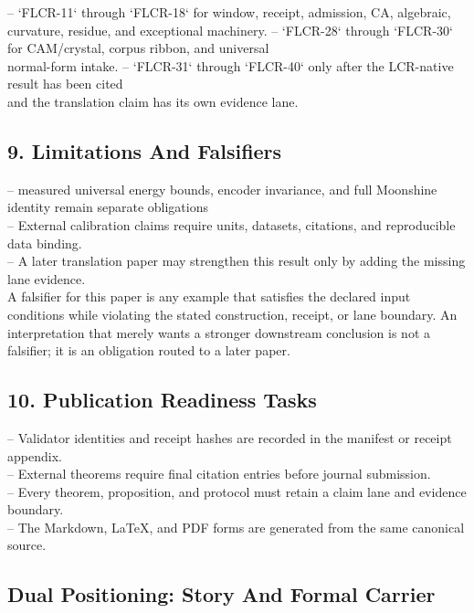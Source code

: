 \documentclass[11pt]{article}
\begin{document}
\noindent{}-- `FLCR-11` through `FLCR-18` for window, receipt, admission, CA, algebraic,\\
  curvature, residue, and exceptional machinery.
\noindent{}-- `FLCR-28` through `FLCR-30` for CAM/crystal, corpus ribbon, and universal\\
  normal-form intake.
\noindent{}-- `FLCR-31` through `FLCR-40` only after the LCR-native result has been cited\\
  and the translation claim has its own evidence lane.

\subsection*{9. Limitations And Falsifiers}

\noindent{}-- measured universal energy bounds, encoder invariance, and full Moonshine identity remain separate obligations\\
\noindent{}-- External calibration claims require units, datasets, citations, and reproducible data binding.\\
\noindent{}-- A later translation paper may strengthen this result only by adding the missing lane evidence.\\

A falsifier for this paper is any example that satisfies the declared input
conditions while violating the stated construction, receipt, or lane boundary.
An interpretation that merely wants a stronger downstream conclusion is not a
falsifier; it is an obligation routed to a later paper.

\subsection*{10. Publication Readiness Tasks}

\noindent{}-- Validator identities and receipt hashes are recorded in the manifest or receipt appendix.\\
\noindent{}-- External theorems require final citation entries before journal submission.\\
\noindent{}-- Every theorem, proposition, and protocol must retain a claim lane and evidence boundary.\\
\noindent{}-- The Markdown, LaTeX, and PDF forms are generated from the same canonical source.\\

\subsection*{Dual Positioning: Story And Formal Carrier}
\end{document}
